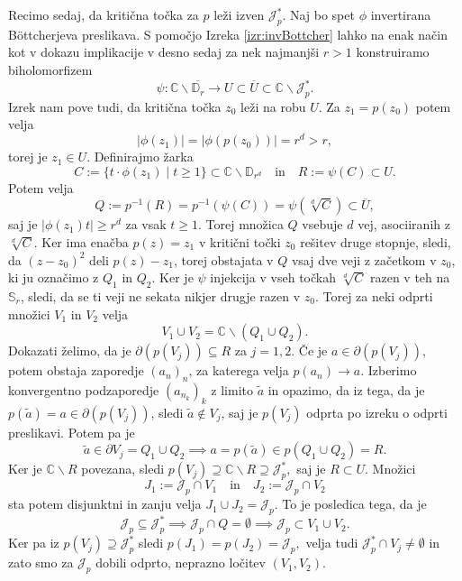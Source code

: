 \documentclass[12pt,a4paper]{amsart}
\theoremstyle{definition} %
\theoremstyle{plain} %
\newcommand{\CC}{\mathbb C}
\newcommand{\D}{\mathbb D} %
\newcommand{\SSS}{\mathbb S} %
\newcommand{\J}{\mathscr J} %
\begin{document}
Recimo sedaj, da kritična točka za $p$ leži izven $\J_p^\ast$. 
Naj bo spet $\phi$ invertirana B{\"o}ttcherjeva preslikava. 
S pomočjo Izreka \ref{izr:invBottcher} lahko na enak način kot v dokazu implikacije v desno
sedaj za nek najmanjši $r > 1$ konstruiramo biholomorfizem
$$\psi \colon \CC \smallsetminus \overline{\D_r} \to U \subset \overline{U} \subset \CC \smallsetminus \J_p^\ast.$$
Izrek nam pove tudi, da kritična točka $z_0$ leži na robu $U$. Za $z_1 = p(z_0)$ potem velja 
$$|\phi(z_1)| = |\phi(p(z_0))| = r^d > r,$$
torej je $z_1 \in U$.
Definirajmo žarka
$$C := \{t \cdot \phi(z_1) \mid t \geq 1\} \subset \CC \smallsetminus \D_{r^d} \quad \text{in} \quad R := \psi(C) \subset U.$$
Potem velja
$$Q := p^{-1}(R) = p^{-1}(\psi(C)) = \psi(\sqrt[d]{C}) \subset \overline{U},$$
saj je $|\phi(z_1)t| \geq r^d$ za vsak $t \geq 1$.
Torej množica $Q$ vsebuje $d$ vej, asociiranih z $\sqrt[d]{C}$.
Ker ima enačba $p(z) = z_1$ v kritični točki $z_0$ rešitev druge stopnje, sledi, da $(z - z_0)^2$ deli $p(z) - z_1$,
torej obstajata v $Q$ vsaj dve veji z začetkom v $z_0$, ki ju označimo z $Q_1$ in $Q_2$.
Ker je $\psi$ injekcija v vseh točkah $\sqrt[d]{C}$ razen v teh na $\SSS_r$, 
sledi, da se ti veji ne sekata nikjer drugje razen v $z_0$.
Torej za neki odprti množici $V_1$ in $V_2$ velja
$$V_1 \cup V_2 = \CC \smallsetminus (Q_1 \cup Q_2).$$
Dokazati želimo, da je $\partial(p(V_j)) \subseteq R$ za $j =1, 2$.
Če je $a \in \partial(p(V_j))$, potem obstaja zaporedje $(a_n)_n$, za katerega velja $p(a_n) \to a$.
Izberimo konvergentno podzaporedje $(a_{n_k})_k$ z limito $\tilde{a}$ in opazimo, 
da iz tega, da je $p(\tilde{a}) = a \in \partial(p(V_j))$, sledi $\tilde{a} \notin V_j$, saj je $p(V_j)$ odprta po izreku o odprti preslikavi.
Potem pa je 
$$\tilde{a} \in \partial V_j = Q_1 \cup Q_2 \implies a = p(\tilde{a}) \in p(Q_1 \cup Q_2) = R.$$
Ker je $\CC \smallsetminus R$ povezana, sledi $p(V_j) \supseteq \CC \smallsetminus R \supseteq \J_p^\ast,$
saj je $R \subset U$. Množici
$$J_1 := \J_p \cap V_1 \quad \text{in} \quad J_2 := \J_p \cap V_2$$
sta potem disjunktni in zanju velja $J_1 \cup J_2 = \J_p$.
To je posledica tega, da je
$$\J_p \subseteq \J_p^\ast \implies \J_p \cap Q = \emptyset \implies \J_p \subset V_1 \cup V_2.$$
Ker pa iz $p(V_j) \supseteq \J_p^\ast$ sledi $p(J_1) = p(J_2) = \J_p,$ velja tudi $\J_p^\ast \cap V_j \neq \emptyset$ in zato
smo za $\J_p$ dobili odprto, neprazno ločitev $(V_1, V_2)$.
\endproof
\end{document}
